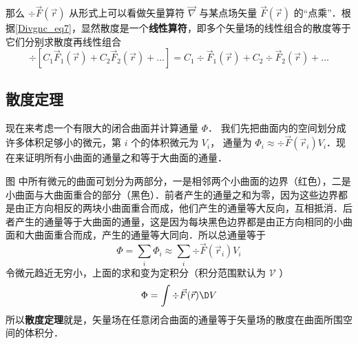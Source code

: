 那么 $\div \vec F(\vec r)$ 从形式上可以看做矢量算符 $\vec\nabla$ 与某点场矢量 $\vec F(\vec r)$ 的“点乘”．根据\autoref{Divgnc_eq7}，显然散度是一个\textbf{线性算符}，即多个矢量场的线性组合的散度等于它们分别求散度再线性组合
\begin{equation}
\div [{C_1}{\vec F_1}(\vec r) + {C_2}{\vec F_2}(\vec r) + ...] = {C_1}\div {\vec F_1}(\vec r) + {C_2}\div {\vec F_2}(\vec r) + \dots
\end{equation}



\subsection{散度定理}

现在来考虑一个有限大的闭合曲面并计算通量 $\Phi$． 我们先把曲面内的空间划分成许多体积足够小的微元，第 $i$ 个的体积微元为 $V_i$， 通量为 ${\Phi _i} \approx \div \vec F({\vec r_i}){V_i}$．现在来证明所有小曲面的通量之和等于大曲面的通量．

图%
中所有微元的曲面可划分为两部分，一是相邻两个小曲面的边界（红色），二是小曲面与大曲面重合的部分（黑色）．前者产生的通量之和为零，因为这些边界都是由正方向相反的两块小曲面重合而成，他们产生的通量等大反向，互相抵消．后者产生的通量等于大曲面的通量，这是因为每块黑色边界都是由正方向相同的小曲面和大曲面重合而成，产生的通量等大同向．所以总通量等于
\begin{equation}
\Phi  = \sum\limits_i {{\Phi _i}}  \approx \sum\limits_i {\div \vec F ({{\vec r}_i}){V_i}} 
\end{equation}
令微元趋近无穷小，上面的求和变为定积分（积分范围默认为 $\mathcal V$ ）
\begin{equation}
\Phi  = \int {\div \vec F(\vec r)\D V}
\end{equation}
所以\textbf{散度定理}就是，矢量场在任意闭合曲面的通量等于矢量场的散度在曲面所围空间的体积分．



